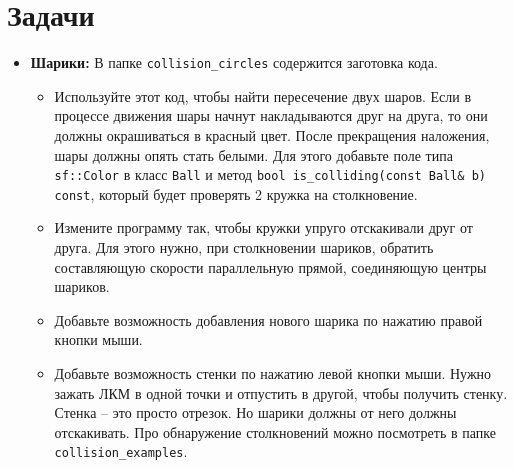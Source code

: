 \documentclass{article}
\begin{document}
\section{Задачи}
\begin{itemize}

\item \textbf{Шарики:} В папке \texttt{collision\_circles} содержится заготовка кода. 
\begin{itemize}
\item Используйте этот код, чтобы найти пересечение двух шаров. Если в процессе движения шары начнут накладываются друг на друга, то они должны окрашиваться в красный цвет. После прекращения наложения, шары должны опять стать белыми. Для этого добавьте поле типа \texttt{sf::Color} в класс \texttt{Ball} и метод \texttt{bool is\_colliding(const Ball\& b) const}, который будет проверять 2 кружка на столкновение.
\item Измените программу так, чтобы кружки упруго отскакивали друг от друга. Для этого нужно, при столкновении шариков, обратить составляющую скорости параллельную прямой, соединяющую центры шариков.
\item Добавьте возможность добавления нового шарика по нажатию правой кнопки мыши.
\item Добавьте возможность стенки по нажатию левой кнопки мыши. Нужно зажать ЛКМ в одной точки и отпустить в другой, чтобы получить стенку. Стенка -- это просто отрезок. Но шарики должны от него должны отскакивать. Про обнаружение столкновений можно посмотреть в папке \texttt{collision\_examples}.
\end{itemize}
\end{itemize}
\fi
\end{document}
